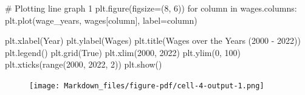 \documentclass[
  letterpaper,
  DIV=11,
  numbers=noendperiod]{scrartcl}
\newenvironment{Shaded}{\begin{snugshade}}{\end{snugshade}}
\newcommand{\BuiltInTok}[1]{\textcolor[rgb]{0.00,0.23,0.31}{#1}}
\newcommand{\CommentTok}[1]{\textcolor[rgb]{0.37,0.37,0.37}{#1}}
\newcommand{\ControlFlowTok}[1]{\textcolor[rgb]{0.00,0.23,0.31}{#1}}
\newcommand{\DecValTok}[1]{\textcolor[rgb]{0.68,0.00,0.00}{#1}}
\newcommand{\KeywordTok}[1]{\textcolor[rgb]{0.00,0.23,0.31}{#1}}
\newcommand{\NormalTok}[1]{\textcolor[rgb]{0.00,0.23,0.31}{#1}}
\newcommand{\OperatorTok}[1]{\textcolor[rgb]{0.37,0.37,0.37}{#1}}
\newcommand{\StringTok}[1]{\textcolor[rgb]{0.13,0.47,0.30}{#1}}
\newcommand{\VariableTok}[1]{\textcolor[rgb]{0.07,0.07,0.07}{#1}}
\begin{document}
\begin{Shaded}
\begin{Highlighting}[]
\CommentTok{\# Plotting line graph 1}
\NormalTok{plt.figure(figsize}\OperatorTok{=}\NormalTok{(}\DecValTok{8}\NormalTok{, }\DecValTok{6}\NormalTok{))}
\ControlFlowTok{for}\NormalTok{ column }\KeywordTok{in}\NormalTok{ wages.columns:}
\NormalTok{    plt.plot(wage\_years, wages[column], label}\OperatorTok{=}\NormalTok{column)}

\NormalTok{plt.xlabel(}\StringTok{\textquotesingle{}Year\textquotesingle{}}\NormalTok{)}
\NormalTok{plt.ylabel(}\StringTok{\textquotesingle{}Wages\textquotesingle{}}\NormalTok{)}
\NormalTok{plt.title(}\StringTok{\textquotesingle{}Wages over the Years (2000 {-} 2022)\textquotesingle{}}\NormalTok{)}
\NormalTok{plt.legend()}
\NormalTok{plt.grid(}\VariableTok{True}\NormalTok{)}
\NormalTok{plt.xlim(}\DecValTok{2000}\NormalTok{, }\DecValTok{2022}\NormalTok{)  }
\NormalTok{plt.ylim(}\DecValTok{0}\NormalTok{, }\DecValTok{100}\NormalTok{)}
\NormalTok{plt.xticks(}\BuiltInTok{range}\NormalTok{(}\DecValTok{2000}\NormalTok{, }\DecValTok{2022}\NormalTok{, }\DecValTok{2}\NormalTok{))}
\NormalTok{plt.show()}
\end{Highlighting}
\end{Shaded}

\begin{figure}[H]

{\centering \texttt{[image: Markdown\_files/figure-pdf/cell-4-output-1.png]}

}

\end{figure}
\end{document}
